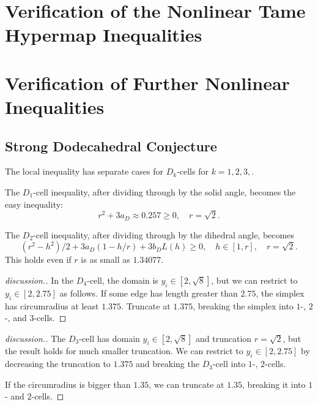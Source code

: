 \chapter{Verification of the Nonlinear Tame Hypermap Inequalities}

\chapter{Verification of Further Nonlinear Inequalities}

\section{Strong Dodecahedral Conjecture}


\begin{calculation}
The local inequality  has separate cases for $D_k$-cells for
$k=1,2,3,$.
\end{calculation}

The $D_1$-cell inequality, after dividing through by the solid angle, becomes
the easy inequality:
\[
r^2 + 3 a_D \approx 0.257 \ge 0,\quad r = \sqrt2.
\]

The $D_2$-cell inequality, after dividing through by the dihedral angle, becomes
\[
 (r^2-h^2)/2 + 3 a_D (1-h/r)  + 3 b_D L(h) \ge 0, \quad h\in [1,r],\quad r = \sqrt2.
\]
This holds even if $r$ is as small as $1.34077$.

\begin{calculation}
\end{calculation}

\begin{proof}[discussion.]
In the $D_4$-cell, the domain is
$y_i\in[2,\sqrt8]$, but we can restrict to $y_i\in[2,2.75]$ as follows.
If some edge has length greater than $2.75$, the simplex has
circumradius at least $1.375$.  Truncate at $1.375$, breaking the
simplex into $1$-, $2$-, and $3$-cells.
\end{proof}

\begin{calculation}
\end{calculation}

\begin{proof}[discussion.]
The $D_3$-cell  has domain $y_i\in[2,\sqrt8]$ and
truncation $r=\sqrt2$, but the result holds for much smaller
truncation.  We can restrict to $y_i\in [2,2.75]$ by decreasing the
truncation to $1.375$ and breaking the $D_3$-cell into $1$-, $2$-cells.

If the circumradius is bigger than $1.35$, we can truncate at $1.35$, breaking
it into $1$- and $2$-cells.  
\end{proof}


